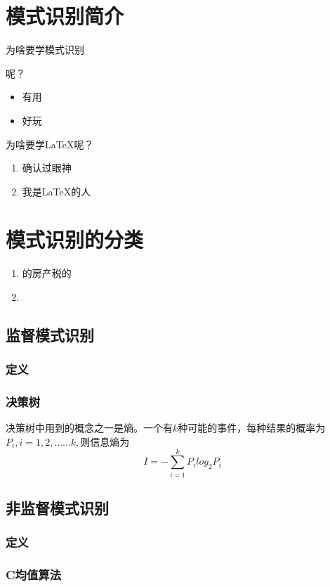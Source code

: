 \documentclass[UTF8]{ctexbook}
\begin{document}
\chapter{模式识别简介} 
为啥要学模式识别


呢？
\begin{itemize}
	\item 有用
	\item 好玩 
	
\end{itemize}
为啥要学\LaTeX 呢？
\begin{enumerate}
	\item 确认过眼神
	\item 我是\LaTeX 的人 
\end{enumerate}



\chapter{模式识别的分类}
\begin{enumerate}
	\item 的房产税的
    \item 
\end{enumerate}


\section{监督模式识别}
\subsection{定义}
\subsection{决策树}
决策树中用到的概念之一是熵。一个有$ k $种可能的事件，每种结果的概率为$ P_i,i=1,2,……k, $则信息熵为
\begin{equation}
I=-\sum_{i=1}^{k}P_ilog_2P_i \label{eq:2-1}
\end{equation} 





\section{非监督模式识别}
\subsection{定义}
\subsection{C均值算法}
\end{document}
